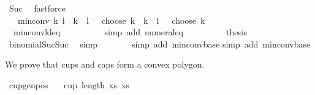 \begin{isabellebody}
\ Suc\ \isamarkupfalse%
\ fastforce\isanewline
\ \ \ \ \ \ \isamarkupfalse%
\ \ \ {\isachardoublequoteopen}min{\isacharunderscore}{\kern0pt}conv\ {\isacharparenleft}{\kern0pt}k{\isacharplus}{\kern0pt}{}{\isacharparenright}{\kern0pt}\ {\isacharparenleft}{\kern0pt}l{\isacharplus}{\kern0pt}{}{\isacharparenright}{\kern0pt}\ {\isacharequal}{\kern0pt}\ {\isacharparenleft}{\kern0pt}k\ {\isacharplus}{\kern0pt}\ l\ {\isacharplus}{\kern0pt}\ {}\ choose\ k{\isacharparenright}{\kern0pt}\ {\isacharplus}{\kern0pt}\ {\isacharparenleft}{\kern0pt}k\ {\isacharplus}{\kern0pt}\ l\ {\isacharplus}{\kern0pt}\ {}\ choose\ k\ {\isacharplus}{\kern0pt}\ {}{\isacharparenright}{\kern0pt}\ {\isacharplus}{\kern0pt}\ {}{\isachardoublequoteclose}\isanewline
\ \ \ \ \ \ \ \ \isamarkupfalse%
\ {}\ min{\isacharunderscore}{\kern0pt}conv{\isacharunderscore}{\kern0pt}k{\isacharunderscore}{\kern0pt}l{\isacharunderscore}{\kern0pt}eq\isanewline
\ \ \ \ \ \ \ \ \isamarkupfalse%
\ {\isacharparenleft}{\kern0pt}simp\ add{\isacharcolon}{\kern0pt}\ numeral{\isacharunderscore}{\kern0pt}{}{\isacharunderscore}{\kern0pt}eq{\isacharunderscore}{\kern0pt}{}{\isacharparenright}{\kern0pt}\isanewline
\ \ \ \ \ \ \isamarkupfalse%
\ \isamarkupfalse%
\ {\isacharquery}{\kern0pt}thesis\ \isamarkupfalse%
\ binomial{\isacharunderscore}{\kern0pt}Suc{\isacharunderscore}{\kern0pt}Suc\ \isamarkupfalse%
\ simp\isanewline
\ \ \ \ \isamarkupfalse%
\isanewline
\ \ \isamarkupfalse%
{\isacharparenleft}{\kern0pt}simp\ add{\isacharcolon}{\kern0pt}\ min{\isacharunderscore}{\kern0pt}conv{\isacharunderscore}{\kern0pt}base{\isacharparenright}{\kern0pt}\isanewline
{}\isamarkupfalse%
{\isacharparenleft}{\kern0pt}simp\ add{\isacharcolon}{\kern0pt}\ min{\isacharunderscore}{\kern0pt}conv{\isacharunderscore}{\kern0pt}base{\isacharparenright}{\kern0pt}%
\endisatagproof
{\isafoldproof}%
%
\isadelimproof
%
\endisadelimproof
%
\begin{isamarkuptext}%
We prove that cups and caps form a convex polygon.%
\end{isamarkuptext}\isamarkuptrue%
\isamarkupfalse%
\ cup{\isacharunderscore}{\kern0pt}genpos{\isacharcolon}{\kern0pt}\isanewline
\ \ \ {\isachardoublequoteopen}cup\ {\isacharparenleft}{\kern0pt}length\ xs{\isacharparenright}{\kern0pt}\ xs{\isachardoublequoteclose}\isanewline

\end{isabellebody}
